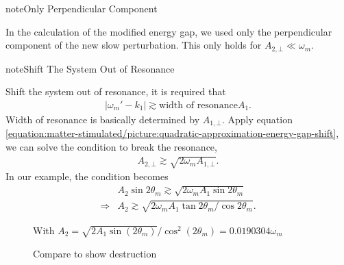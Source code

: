 \documentclass[letterpaper,12pt,english]{sphinxmanual}
\begin{document}
\begin{sphinxadmonition}{note}{Only Perpendicular Component}

In the calculation of the modified energy gap, we used only the perpendicular component of the new slow perturbation. This only holds for \(A_{2,\bot}  \ll \omega_m\).

\end{sphinxadmonition}

\begin{sphinxadmonition}{note}{Shift The System Out of Resonance}

Shift the system out of resonance, it is required that
\begin{equation*}
\begin{split}\lvert \omega_m' - k_1 \rvert \gtrsim \text{width of resonance} A_1.\end{split}
\end{equation*}
Width of resonance is basically determined by \(A_{1,\bot}\). Apply equation \eqref{equation:matter-stimulated/picture:quadratic-approximation-energy-gap-shift}, we can solve the condition to break the resonance,
\begin{equation*}
\begin{split}A_{2,\bot} \gtrsim \sqrt{2\omega_m A_{1,\bot}}.\end{split}
\end{equation*}
In our example, the condition becomes
\begin{equation*}
\begin{split}&A_2 \sin 2\theta_m \gtrsim \sqrt{2\omega_m A_1 \sin 2\theta_m} \\
\Rightarrow & A_2  \gtrsim \sqrt{2\omega_m A_1 \tan 2\theta_m/\cos 2\theta_m}.\end{split}
\end{equation*}\begin{figure}[htbp]
\centering
\capstart

\noindent{}
\caption{With \(A_2=\sqrt{2 A_1 \sin (2 \theta_m)}/ \cos ^2(2 \theta_m) =0.0190304\omega_m\)}\label{\detokenize{matter-stimulated/picture:id8}}\end{figure}
\begin{figure}[htbp]
\centering
\capstart

\noindent{}
\caption{Compare to show destruction}\label{\detokenize{matter-stimulated/picture:id9}}\end{figure}


\end{sphinxadmonition}
\end{document}
